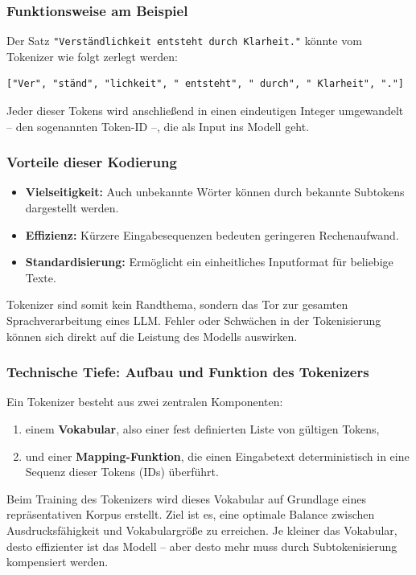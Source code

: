 \subsubsection*{Funktionsweise am Beispiel}
Der Satz \texttt{"Verständlichkeit entsteht durch Klarheit."} könnte vom Tokenizer wie folgt zerlegt werden:

\begin{verbatim}
["Ver", "ständ", "lichkeit", " entsteht", " durch", " Klarheit", "."]
\end{verbatim}

Jeder dieser Tokens wird anschließend in einen eindeutigen Integer umgewandelt – den sogenannten Token-ID –, die als Input ins Modell geht.

\subsubsection{Vorteile dieser Kodierung}
\begin{itemize}
  \item \textbf{Vielseitigkeit:} Auch unbekannte Wörter können durch bekannte Subtokens dargestellt werden.
  \item \textbf{Effizienz:} Kürzere Eingabesequenzen bedeuten geringeren Rechenaufwand.
  \item \textbf{Standardisierung:} Ermöglicht ein einheitliches Inputformat für beliebige Texte.
\end{itemize}

Tokenizer sind somit kein Randthema, sondern das Tor zur gesamten Sprachverarbeitung eines LLM. Fehler oder Schwächen in der Tokenisierung können sich direkt auf die Leistung des Modells auswirken.

\subsubsection*{Technische Tiefe: Aufbau und Funktion des Tokenizers}

Ein Tokenizer besteht aus zwei zentralen Komponenten:
\begin{enumerate}
  \item einem \textbf{Vokabular}, also einer fest definierten Liste von gültigen Tokens,
  \item und einer \textbf{Mapping-Funktion}, die einen Eingabetext deterministisch in eine Sequenz dieser Tokens (IDs) überführt.
\end{enumerate}

Beim Training des Tokenizers wird dieses Vokabular auf Grundlage eines repräsentativen Korpus erstellt. Ziel ist es, eine optimale Balance zwischen Ausdrucksfähigkeit und Vokabulargröße zu erreichen. Je kleiner das Vokabular, desto effizienter ist das Modell – aber desto mehr muss durch Subtokenisierung kompensiert werden.

